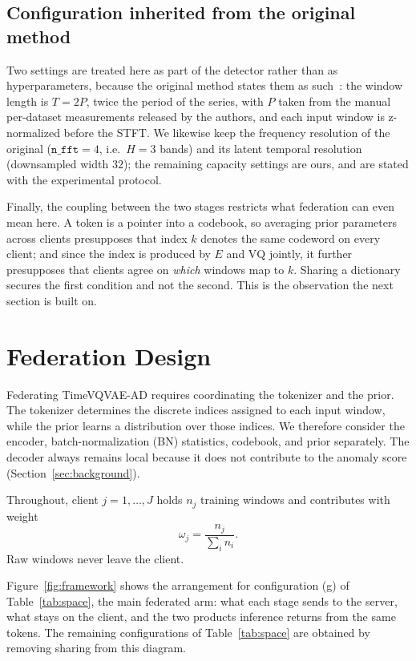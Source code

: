 \documentclass[conference]{IEEEtran}
\begin{document}
\subsection{Configuration inherited from the original method}

Two settings are treated here as part of the detector rather than as hyperparameters, because the
original method states them as such~\cite{lee2024timevqvaead}: the window length is $T = 2P$, twice
the period of the series, with $P$ taken from the manual per-dataset measurements released by the
authors, and each input window is z-normalized before the STFT. We likewise keep
the frequency resolution of the original ($\texttt{n\_fft} = 4$, i.e.\ $H = 3$ bands) and its latent
temporal resolution (downsampled width $32$); the remaining capacity settings are ours, and are
stated with the experimental protocol.

Finally, the coupling between the two stages restricts what federation can even mean here. A token
is a pointer into a codebook, so averaging prior parameters across clients presupposes that index
$k$ denotes the same codeword on every client; and since the index is produced by $E$ and
$\mathrm{VQ}$ jointly, it further presupposes that clients agree on \emph{which} windows map to $k$.
Sharing a dictionary secures the first condition and not the second. This is the observation the
next section is built on.

\section{Federation Design}
\label{sec:design}

Federating TimeVQVAE-AD requires coordinating the tokenizer and the prior. The tokenizer determines the discrete indices assigned to each input window, while the prior learns a distribution over those indices. We therefore consider the encoder, batch-normalization (BN) statistics, codebook, and prior separately. The decoder always remains local because it does not contribute to the anomaly score (Section~\ref{sec:background}).

Throughout, client $j=1,\dots,J$ holds $n_j$ training windows and contributes with weight
\begin{equation}
    \omega_j = \frac{n_j}{\sum_i n_i}.
\end{equation}
Raw windows never leave the client.

Figure~\ref{fig:framework} shows the arrangement for configuration (g) of
Table~\ref{tab:space}, the main federated arm: what each stage sends to the server, what stays on
the client, and the two products inference returns from the same tokens. The remaining
configurations of Table~\ref{tab:space} are obtained by removing sharing from this diagram.
\end{document}
